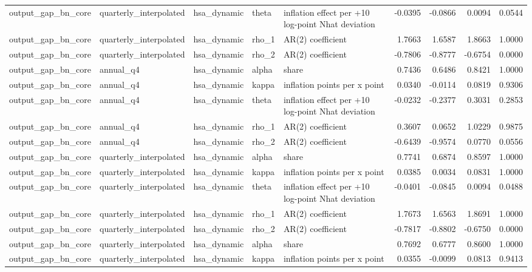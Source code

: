 \begin{tabular}{lllllrrrr}
output\_gap\_bn\_core & quarterly\_interpolated & hsa\_dynamic & theta & inflation effect per +10 log-point Nhat deviation & -0.0395 & -0.0866 & 0.0094 & 0.0544 \\
output\_gap\_bn\_core & quarterly\_interpolated & hsa\_dynamic & rho\_1 & AR(2) coefficient & 1.7663 & 1.6587 & 1.8663 & 1.0000 \\
output\_gap\_bn\_core & quarterly\_interpolated & hsa\_dynamic & rho\_2 & AR(2) coefficient & -0.7806 & -0.8777 & -0.6754 & 0.0000 \\
output\_gap\_bn\_core & annual\_q4 & hsa\_dynamic & alpha & share & 0.7436 & 0.6486 & 0.8421 & 1.0000 \\
output\_gap\_bn\_core & annual\_q4 & hsa\_dynamic & kappa & inflation points per x point & 0.0340 & -0.0114 & 0.0819 & 0.9306 \\
output\_gap\_bn\_core & annual\_q4 & hsa\_dynamic & theta & inflation effect per +10 log-point Nhat deviation & -0.0232 & -0.2377 & 0.3031 & 0.2853 \\
output\_gap\_bn\_core & annual\_q4 & hsa\_dynamic & rho\_1 & AR(2) coefficient & 0.3607 & 0.0652 & 1.0229 & 0.9875 \\
output\_gap\_bn\_core & annual\_q4 & hsa\_dynamic & rho\_2 & AR(2) coefficient & -0.6439 & -0.9574 & 0.0770 & 0.0556 \\
output\_gap\_bn\_core & quarterly\_interpolated & hsa\_dynamic & alpha & share & 0.7741 & 0.6874 & 0.8597 & 1.0000 \\
output\_gap\_bn\_core & quarterly\_interpolated & hsa\_dynamic & kappa & inflation points per x point & 0.0385 & 0.0034 & 0.0831 & 1.0000 \\
output\_gap\_bn\_core & quarterly\_interpolated & hsa\_dynamic & theta & inflation effect per +10 log-point Nhat deviation & -0.0401 & -0.0845 & 0.0094 & 0.0488 \\
output\_gap\_bn\_core & quarterly\_interpolated & hsa\_dynamic & rho\_1 & AR(2) coefficient & 1.7673 & 1.6563 & 1.8691 & 1.0000 \\
output\_gap\_bn\_core & quarterly\_interpolated & hsa\_dynamic & rho\_2 & AR(2) coefficient & -0.7817 & -0.8802 & -0.6750 & 0.0000 \\
output\_gap\_bn\_core & quarterly\_interpolated & hsa\_dynamic & alpha & share & 0.7692 & 0.6777 & 0.8600 & 1.0000 \\
output\_gap\_bn\_core & quarterly\_interpolated & hsa\_dynamic & kappa & inflation points per x point & 0.0355 & -0.0099 & 0.0813 & 0.9413 \\

\end{tabular}
